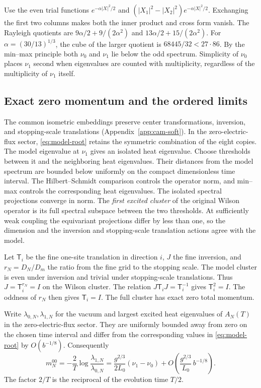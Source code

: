 \documentclass[11pt,a4paper]{article}
\numberwithin{equation}{section}
\begin{document}
Use the even trial functions \(e^{-\alpha|X|^2/2}\) and \((|X_1|^2-|X_2|^2)e^{-\alpha|X|^2/2}\). Exchanging the first two columns makes both the inner product and cross form vanish. The Rayleigh quotients are \(9\alpha/2+9/(2\alpha^2)\) and \(13\alpha/2+15/(2\alpha^2)\). For \(\alpha=(30/13)^{1/3}\), the cube of the larger quotient is \(68445/32<27\cdot86\). By the min--max principle both \(\nu_0\) and \(\nu_1\) lie below the odd spectrum. Simplicity of \(\nu_0\) places \(\nu_1\) second when eigenvalues are counted with multiplicity, regardless of the multiplicity of \(\nu_1\) itself.

\subsection{Exact zero momentum and the ordered limits}

The common isometric embeddings preserve center transformations, inversion, and stopping-scale translations (Appendix~\ref{app:cam-soft}). In the zero-electric-flux sector, \eqref{eq:model-root} retains the symmetric combination of the eight copies. The model eigenvalue at \(\nu_1\) gives an isolated heat eigenvalue. Choose thresholds between it and the neighboring heat eigenvalues. Their distances from the model spectrum are bounded below uniformly on the compact dimensionless time interval. The Hilbert--Schmidt comparison controls the operator norm, and min--max controls the corresponding heat eigenvalues. The isolated spectral projections converge in norm. The \emph{first excited cluster} of the original Wilson operator is its full spectral subspace between the two thresholds. At sufficiently weak coupling the equivariant projections differ by less than one, so the dimension and the inversion and stopping-scale translation actions agree with the model.

Let \(\mathsf T_i\) be the fine one-site translation in direction \(i\), \(J\) the fine inversion, and \(r_N=D_N/D_m\) the ratio from the fine grid to the stopping scale. The model cluster is even under inversion and trivial under stopping-scale translations. Thus \(J=\mathsf T_i^{r_N}=I\) on the Wilson cluster. The relation \(J\mathsf T_iJ=\mathsf T_i^{-1}\) gives \(\mathsf T_i^2=I\). The oddness of \(r_N\) then gives \(\mathsf T_i=I\). The full cluster has exact zero total momentum.

Write \(\lambda_{0,N},\lambda_{1,N}\) for the vacuum and largest excited heat eigenvalues of \(A_N(T)\) in the zero-electric-flux sector. They are uniformly bounded away from zero on the chosen time interval and differ from the corresponding values in \eqref{eq:model-root} by \(O(b^{-1/8})\). Consequently
\begin{equation}
 m_N^{00}
 =-\frac2T\log\frac{\lambda_{1,N}}{\lambda_{0,N}}
 =\frac{g^{2/3}}{2L_0}(\nu_1-\nu_0)
     +O\!\left(\frac{g^{2/3}}{L_0}\,b^{-1/8}\right).
 \label{eq:original-gap-readout}
\end{equation}
The factor \(2/T\) is the reciprocal of the evolution time \(T/2\).
\end{document}
